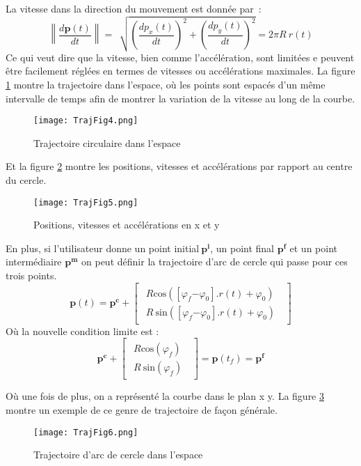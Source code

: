 La vitesse dans la direction du mouvement est donn\'{e}e par~:
\[\left\|\frac{d\bm{p}(t)}{dt}\right\|=\ \ \sqrt{{\left(\frac{dp_x(t)}{dt}\right)}^2+{\left(\frac{dp_y(t)}{dt}\right)}^2}=2\pi R\ r(t)\] 
Ce qui veut dire que la vitesse, bien comme l'acc\'{e}l\'{e}ration, sont limit\'{e}es e peuvent \^{e}tre facilement r\'{e}gl\'{e}es en termes de vitesses ou acc\'{e}l\'{e}rations maximales. La figure \ref{eller4} montre la trajectoire dans l'espace, o\`{u} les points sont espac\'{e}s d'un m\^{e}me intervalle de temps afin de montrer la variation de la vitesse au long de la courbe. 

\begin{figure}[H]
	\centering
	\texttt{[image: TrajFig4.png]}
	\caption{Trajectoire circulaire dans l'espace}
	\label{eller4}	
\end{figure}

Et la figure \ref{eller5} montre les positions, vitesses et acc\'{e}l\'{e}rations par rapport au centre du cercle.  

\begin{figure}[H]
	\captionsetup{justification=centering,margin=1cm}
	\texttt{[image: TrajFig5.png]}
	\caption{Positions, vitesses et acc\'{e}l\'{e}rations en x et y}
	\label{eller5}
\end{figure}


En plus, si l'utilisateur donne un point initial${\boldsymbol{\ }\boldsymbol{p}}^{\boldsymbol{i}}$, un point final ${\boldsymbol{p}}^{\boldsymbol{f}}$ et un point interm\'{e}diaire ${\bm{p}}^{\bm{m}}$ on peut d\'{e}finir la trajectoire d'arc de cercle qui passe pour ces trois points.  
\[\bm{p}\left(t\right)={\bm{p}}^{\bm{c}}+\left[ \begin{array}{c}
\begin{array}{c}
R{\mathrm{cos} (\left[{\varphi }_f{-\varphi }_0\right].r\left(t\right)+{\varphi }_0)\ } \\ 
R\ {\mathrm{sin} (\left[{\varphi }_f{-\varphi }_0\right].r\left(t\right)+{\varphi }_0)\ } \end{array}
\end{array}
\right]\] 
O\`{u} la nouvelle condition limite est : 
 \[{\boldsymbol{p}}^{\boldsymbol{c}}+\left[ \begin{array}{c}
\begin{array}{c}
R{\mathrm{cos} ({\varphi }_f)\ } \\ 
R\ {\mathrm{sin} ({\varphi }_f)\ } \end{array}
\end{array}
\right]=\bm{p}\left(t_f\right) = {\bm{p}}^{\bm{f}}\]

O\`{u} une fois de plus, on a repr\'{e}sent\'{e} la courbe dans le plan x y. La figure \ref{eller6} montre un exemple de ce genre de trajectoire de fa\c{c}on g\'{e}n\'{e}rale.


\begin{figure}[H]
	\centering
	\captionsetup{justification=centering,margin=1cm}
	\texttt{[image: TrajFig6.png]}
	\caption{Trajectoire d'arc de cercle dans l'espace}
	\label{eller6}
\end{figure}
